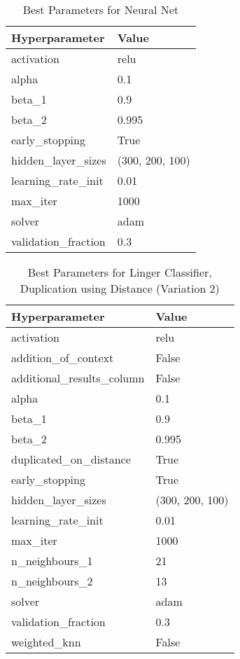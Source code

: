 \documentclass[a4paper, 12pt]{report}
\begin{document}
\begin{table}[H]
    \centering
    \caption{Best Parameters for Neural Net}
    \label{tab:best_parameters_neural_net_LCV2_Glass}
    \begin{tabular}{|l|l|}
    \hline
    \textbf{Hyperparameter} & \textbf{Value} \\ \hline
    activation & relu \\ \hline
    alpha & 0.1 \\ \hline
    beta\_1 & 0.9 \\ \hline
    beta\_2 & 0.995 \\ \hline
    early\_stopping & True \\ \hline
    hidden\_layer\_sizes & (300, 200, 100) \\ \hline
    learning\_rate\_init & 0.01 \\ \hline
    max\_iter & 1000 \\ \hline
    solver & adam \\ \hline
    validation\_fraction & 0.3 \\ \hline
    \end{tabular}
\end{table}

\begin{table}[H]
    \centering
    \caption{Best Parameters for Linger Classifier, Duplication using Distance (Variation 2)}
    \label{tab:best_parameters_linger_classifier_LCV2_Glass}
    \begin{tabular}{|l|l|}
    \hline
    \textbf{Hyperparameter} & \textbf{Value} \\ \hline
    activation & relu \\ \hline
    addition\_of\_context & False \\ \hline
    additional\_results\_column & False \\ \hline
    alpha & 0.1 \\ \hline
    beta\_1 & 0.9 \\ \hline
    beta\_2 & 0.995 \\ \hline
    duplicated\_on\_distance & True \\ \hline
    early\_stopping & True \\ \hline
    hidden\_layer\_sizes & (300, 200, 100) \\ \hline
    learning\_rate\_init & 0.01 \\ \hline
    max\_iter & 1000 \\ \hline
    n\_neighbours\_1 & 21 \\ \hline
    n\_neighbours\_2 & 13 \\ \hline
    solver & adam \\ \hline
    validation\_fraction & 0.3 \\ \hline
    weighted\_knn & False \\ \hline
    \end{tabular}
\end{table}
\end{document}
